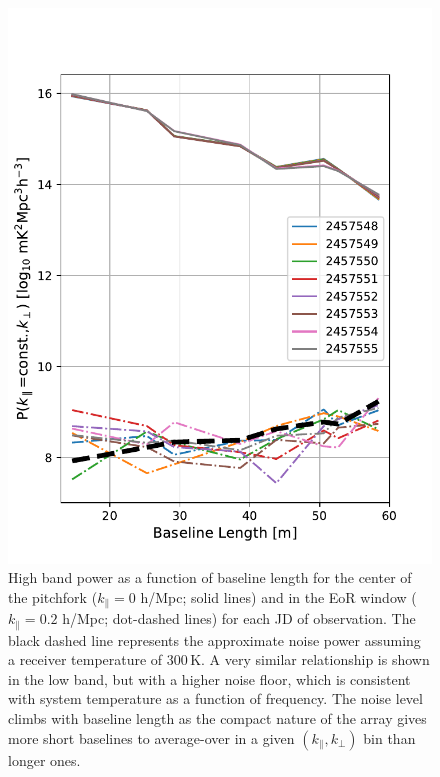 \begin{figure}
\centering
\includegraphics[scale=0.5]{chapters/eor_window_HERA/figures/highband_by_day.pdf}
\caption[High band power as a function of baseline length for the center of the pitchfork ($k_{\parallel}=0$ h/Mpc) and in the EoR window ($k_{\parallel}=0.2$ h/Mpc) for each JD of observation. ]{High band power as a function of baseline length for the center of the pitchfork ($k_{\parallel}=0$ h/Mpc; solid lines) and in the EoR window ($k_{\parallel}=0.2$ h/Mpc; dot-dashed lines) for each JD of observation. The black dashed line represents the approximate noise power assuming a receiver temperature of 300\,K. A very similar relationship is shown in the low band, but with a higher noise floor, which is consistent with system temperature as a function of frequency. The noise level climbs with baseline length as the compact nature of the array gives more short baselines to average-over in a given $(k_{\parallel},k_{\perp})$ bin than longer ones.}
\label{fig:hera19_highband_cuts_per_day}
\end{figure}

